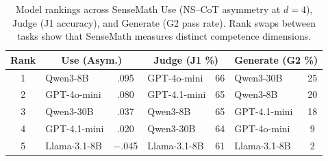 \begin{table}[t]
\centering
\caption{Model rankings across SenseMath Use (NS--CoT asymmetry at $d\!=\!4$), Judge (J1 accuracy), and Generate (G2 pass rate). Rank swaps between tasks show that SenseMath measures distinct competence dimensions.}
\label{tab:ranks}
\small
\begin{tabular}{c lc lc lc}
\toprule
Rank & \multicolumn{2}{c}{Use (Asym.)} & \multicolumn{2}{c}{Judge (J1 \%)} & \multicolumn{2}{c}{Generate (G2 \%)} \\
\midrule
1 & Qwen3-8B     & .095 & GPT-4o-mini  & 66 & Qwen3-30B    & 25 \\
2 & GPT-4o-mini  & .080 & GPT-4.1-mini & 65 & Qwen3-8B     & 20 \\
3 & Qwen3-30B    & .037 & Qwen3-8B     & 65 & GPT-4.1-mini & 18 \\
4 & GPT-4.1-mini & .020 & Qwen3-30B    & 64 & GPT-4o-mini  &  9 \\
5 & Llama-3.1-8B & $-$.045 & Llama-3.1-8B & 61 & Llama-3.1-8B &  2 \\
\bottomrule
\end{tabular}
\end{table}
